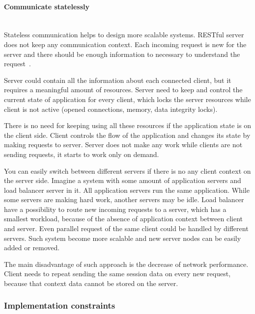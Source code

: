 \paragraph{Communicate statelessly} ~\\

Stateless communication helps to design more scalable systems.
RESTful server does not  keep any communication context. Each incoming  request
is new for the server and there should be enough information to necessary to
understand the request~\cite{Fielding2000}.

Server could contain all the information about each connected client, but it
requires a meaningful amount of resources. Server need to keep and control the
current state of application for every client, which locks the server resources
while client is not active (opened connections, memory, data integrity locks).

There is no need for keeping using all these resources if the application state
is on the client side. Client controls the flow of the application and
changes its state by making requests to server. Server does not make any work
while clients are not sending requests, it starts to work only on demand.

You can easily switch between different servers if there is no any client
context on the server side. Imagine a system with some amount of application
servers and load balancer server in it. All application servers run the same
application. While some servers are making hard work, another servers may be
idle.
Load balancer have a possibility to route new incoming requests to a server,
which has a smallest workload, because of the absence of application context
between client and server. Even parallel request of the same client could be
handled by different servers. Such system become more scalable and new server
nodes can be easily added or removed.

The main disadvantage of such approach is the decrease of network performance.
Client needs to repeat sending the same session data on every new request,
because that context data cannot be stored on the server. 


\subsubsection{Implementation constraints}

